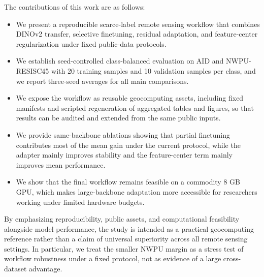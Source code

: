 The contributions of this work are as follows:
\begin{itemize}
  \item We present a reproducible scarce-label remote sensing workflow that combines DINOv2 transfer, selective finetuning, residual adaptation, and feature-center regularization under fixed public-data protocols.
  \item We establish seed-controlled class-balanced evaluation on AID and NWPU-RESISC45 with 20 training samples and 10 validation samples per class, and we report three-seed averages for all main comparisons.
  \item We expose the workflow as reusable geocomputing assets, including fixed manifests and scripted regeneration of aggregated tables and figures, so that results can be audited and extended from the same public inputs.
  \item We provide same-backbone ablations showing that partial finetuning contributes most of the mean gain under the current protocol, while the adapter mainly improves stability and the feature-center term mainly improves mean performance.
  \item We show that the final workflow remains feasible on a commodity 8 GB GPU, which makes large-backbone adaptation more accessible for researchers working under limited hardware budgets.
\end{itemize}

By emphasizing reproducibility, public assets, and computational feasibility alongside model performance, the study is intended as a practical geocomputing reference rather than a claim of universal superiority across all remote sensing settings. In particular, we treat the smaller NWPU margin as a stress test of workflow robustness under a fixed protocol, not as evidence of a large cross-dataset advantage.
